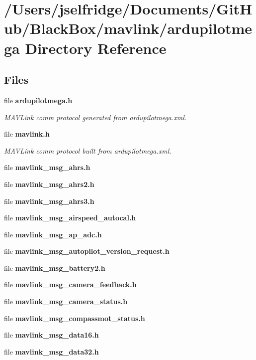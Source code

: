 \section{/\+Users/jselfridge/\+Documents/\+Git\+Hub/\+Black\+Box/mavlink/ardupilotmega Directory Reference}
\label{dir_0be927e9bb8ab5757cd6b87462912031}
\subsection*{Files}
\begin{DoxyCompactItemize}
\item 
file \textbf{ ardupilotmega.\+h}
\begin{DoxyCompactList}\small\item\em M\+A\+V\+Link comm protocol generated from ardupilotmega.\+xml. \end{DoxyCompactList}\item 
file \textbf{ mavlink.\+h}
\begin{DoxyCompactList}\small\item\em M\+A\+V\+Link comm protocol built from ardupilotmega.\+xml. \end{DoxyCompactList}\item 
file \textbf{ mavlink\+\_\+msg\+\_\+ahrs.\+h}
\item 
file \textbf{ mavlink\+\_\+msg\+\_\+ahrs2.\+h}
\item 
file \textbf{ mavlink\+\_\+msg\+\_\+ahrs3.\+h}
\item 
file \textbf{ mavlink\+\_\+msg\+\_\+airspeed\+\_\+autocal.\+h}
\item 
file \textbf{ mavlink\+\_\+msg\+\_\+ap\+\_\+adc.\+h}
\item 
file \textbf{ mavlink\+\_\+msg\+\_\+autopilot\+\_\+version\+\_\+request.\+h}
\item 
file \textbf{ mavlink\+\_\+msg\+\_\+battery2.\+h}
\item 
file \textbf{ mavlink\+\_\+msg\+\_\+camera\+\_\+feedback.\+h}
\item 
file \textbf{ mavlink\+\_\+msg\+\_\+camera\+\_\+status.\+h}
\item 
file \textbf{ mavlink\+\_\+msg\+\_\+compassmot\+\_\+status.\+h}
\item 
file \textbf{ mavlink\+\_\+msg\+\_\+data16.\+h}
\item 
file \textbf{ mavlink\+\_\+msg\+\_\+data32.\+h}

\end{DoxyCompactItemize}

